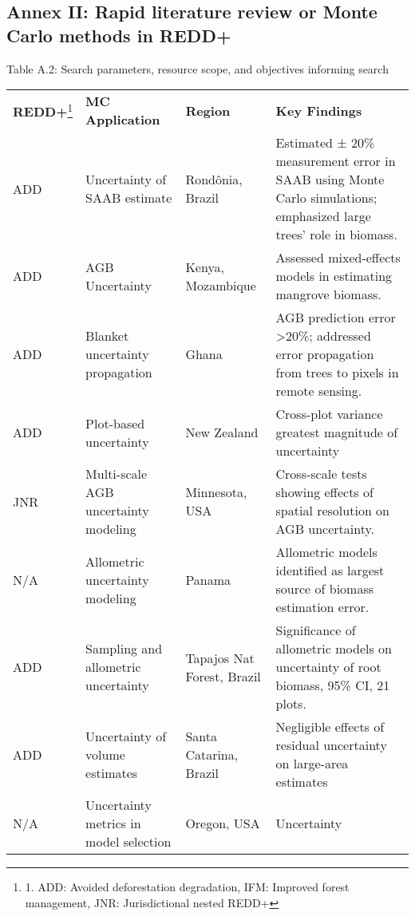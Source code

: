 \documentclass[
]{article}
\begin{document}
\subsection{Annex II: Rapid literature review or Monte Carlo methods in
REDD+}\label{annex-ii-rapid-literature-review-or-monte-carlo-methods-in-redd}

Table A.2: Search parameters, resource scope, and objectives informing
search

\begin{longtable}[]{@{}
  >{\raggedright\arraybackslash}p{}
  >{\raggedright\arraybackslash}p{}
  >{\raggedright\arraybackslash}p{}
  >{\raggedright\arraybackslash}p{}@{}}
\toprule\noalign{}
\endhead
\bottomrule\noalign{}
\endlastfoot
\textbf{REDD+}\footnote{1. ADD: Avoided deforestation degradation, IFM:
  Improved forest management, JNR: Jurisdictional nested REDD+} &
\textbf{MC Application} & \textbf{Region} & \textbf{Key Findings} \\
ADD & Uncertainty of SAAB estimate & Rondônia, Brazil & Estimated ± 20\%
measurement error in SAAB using Monte Carlo simulations; emphasized
large trees' role in biomass. \\
ADD & AGB Uncertainty & Kenya, Mozambique & Assessed mixed-effects
models in estimating mangrove biomass. \\
ADD & Blanket uncertainty propagation & Ghana & AGB prediction error
\textgreater20\%; addressed error propagation from trees to pixels in
remote sensing. \\
ADD & Plot-based uncertainty & New Zealand & Cross-plot variance
greatest magnitude of uncertainty \\
JNR & Multi-scale AGB uncertainty modeling & Minnesota, USA &
Cross-scale tests showing effects of spatial resolution on AGB
uncertainty. \\
N/A & Allometric uncertainty modeling & Panama & Allometric models
identified as largest source of biomass estimation error. \\
ADD & Sampling and allometric uncertainty & Tapajos Nat Forest, Brazil &
Significance of allometric models on uncertainty of root biomass, 95\%
CI, 21 plots. \\
ADD & Uncertainty of volume estimates & Santa Catarina, Brazil &
Negligible effects of residual uncertainty on large-area estimates \\
N/A & Uncertainty metrics in model selection & Oregon, USA & Uncertainty

\end{longtable}
\end{document}
